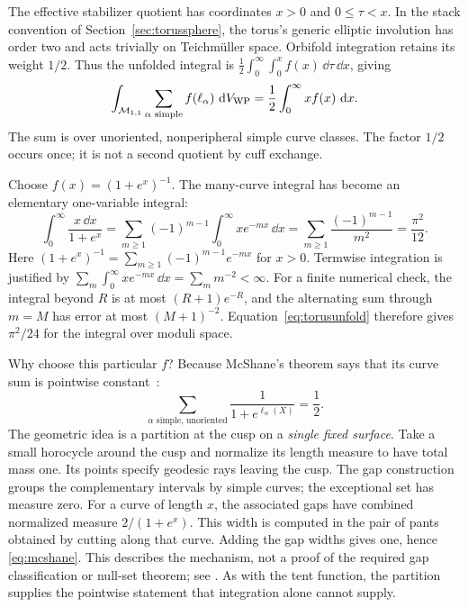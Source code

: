 The effective stabilizer quotient has coordinates
$x>0$ and $0\le\tau<x$. In the stack convention of
Section~\ref{sec:torussphere}, the torus's generic elliptic
involution has order two and acts trivially on Teichm\"uller
space. Orbifold integration retains its weight $1/2$.
Thus the unfolded integral is
$\frac12\int_0^\infty\int_0^x f(x)\,\dd\tau\,\dd x$, giving
\begin{equation}
 \int_{\mathcal M_{1,1}}\sum_{\alpha\text{ simple}}f(\ell_\alpha)\,\mathop{}\!\mathrm d V_{\mathrm{WP}}
       =\frac12\int_0^\infty x f(x)\,\mathop{}\!\mathrm d x.
 \label{eq:torusunfold}
\end{equation}
The sum is over unoriented, nonperipheral simple curve classes.
The factor $1/2$ occurs once; it is not a second quotient by
cuff exchange.

Choose $f(x)=(1+e^x)^{-1}$. The many-curve integral has become
an elementary one-variable integral:
\[
 \int_0^\infty\frac{x\,\dd x}{1+e^x}
 =\sum_{m\ge1}(-1)^{m-1}\int_0^\infty xe^{-mx}\,\dd x
 =\sum_{m\ge1}\frac{(-1)^{m-1}}{m^2}
 =\frac{\pi^2}{12}.
\]
Here $(1+e^x)^{-1}=\sum_{m\ge1}(-1)^{m-1}e^{-mx}$ for $x>0$.
Termwise integration is justified by
$\sum_m\int_0^\infty xe^{-mx}\,\dd x=\sum_m m^{-2}<\infty$.
For a finite numerical check, the integral beyond $R$ is at most
$(R+1)e^{-R}$, and the alternating sum through $m=M$ has error
at most $(M+1)^{-2}$.
Equation~\eqref{eq:torusunfold} therefore gives $\pi^2/24$
for the integral over moduli space.

Why choose this particular $f$? Because McShane's theorem says
that its curve sum is pointwise constant~\cite{McShane}:
\begin{equation}
 \sum_{\alpha\text{ simple, unoriented}}
                 \frac{1}{1+e^{\ell_\alpha(X)}}=\frac12.
 \label{eq:mcshane}
\end{equation}
The geometric idea is a partition at the cusp on a
\emph{single fixed surface}. Take a small horocycle around
the cusp and normalize its length measure to have total mass
one. Its points specify geodesic rays leaving the cusp.
The gap construction groups the complementary intervals by
simple curves; the exceptional set has measure zero.
For a curve of length $x$, the associated gaps have combined
normalized measure $2/(1+e^x)$. This width is computed in the
pair of pants obtained by cutting along that curve.
Adding the gap widths gives one, hence \eqref{eq:mcshane}.
This describes the mechanism, not a proof of the required
gap classification or null-set theorem; see
\cite[Sections 3, 5, and 9]{McShanePants}.
As with the tent function, the partition supplies the
pointwise statement that integration alone cannot supply.

